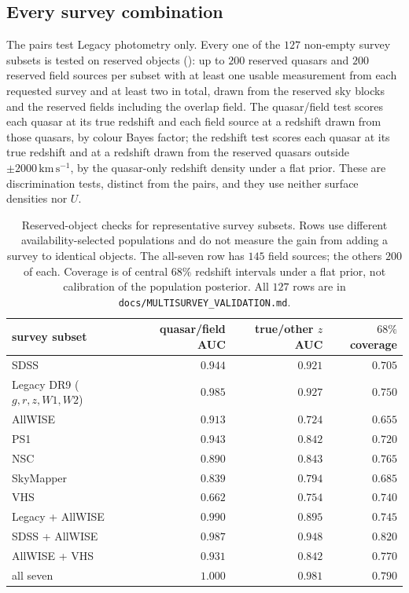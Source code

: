 \documentclass[11pt,a4paper]{article}
\newcommand{\kms}{\,\mathrm{km\,s^{-1}}}
\begin{document}
\subsection{Every survey combination}
\label{sec:subsets}

The pairs test Legacy photometry only. Every one of the $127$ non-empty survey
subsets is tested on reserved objects ():
up to $200$ reserved quasars and $200$ reserved field sources per subset with at
least one usable measurement from each requested survey and at least two in
total, drawn from the reserved sky blocks and the reserved fields including the
overlap field. The quasar/field test scores each quasar at its true redshift and
each field source at a redshift drawn from those quasars, by colour Bayes factor;
the redshift test scores each quasar at its true redshift and at a redshift drawn
from the reserved quasars outside $\pm2000\kms$, by the quasar-only redshift
density under a flat prior. These are discrimination tests, distinct from the
pairs, and they use neither surface densities nor $U$.

\begin{table}[htbp]
\centering
\small
\begin{tabular}{@{}lrrr@{}}
\toprule
survey subset & quasar/field AUC & true/other $z$ AUC & $68\%$ coverage \\
\midrule
SDSS                      & $0.944$ & $0.921$ & $0.705$ \\
Legacy DR9 ($g,r,z,W1,W2$) & $0.985$ & $0.927$ & $0.750$ \\
AllWISE                   & $0.913$ & $0.724$ & $0.655$ \\
PS1                       & $0.943$ & $0.842$ & $0.720$ \\
NSC                       & $0.890$ & $0.843$ & $0.765$ \\
SkyMapper                 & $0.839$ & $0.794$ & $0.685$ \\
VHS                       & $0.662$ & $0.754$ & $0.740$ \\
Legacy + AllWISE          & $0.990$ & $0.895$ & $0.745$ \\
SDSS + AllWISE            & $0.987$ & $0.948$ & $0.820$ \\
AllWISE + VHS             & $0.931$ & $0.842$ & $0.770$ \\
all seven                 & $1.000$ & $0.981$ & $0.790$ \\
\bottomrule
\end{tabular}
\caption{Reserved-object checks for representative survey subsets. Rows use
different availability-selected populations and do not measure the gain from
adding a survey to identical objects. The all-seven row has $145$ field sources;
the others $200$ of each. Coverage is of central $68\%$ redshift intervals under a
flat prior, not calibration of the population posterior. All $127$ rows are in
\texttt{docs/MULTISURVEY\_VALIDATION.md}.}
\label{tab:subsets}
\end{table}
\end{document}

